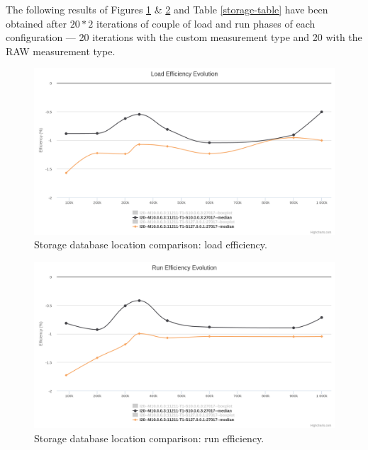 \documentclass[a4paper,11pt]{report}
\begin{document}
The following results of Figures \ref{storage-T1-Mremote-load}  \& \ref{storage-T1-Mremote-run} and Table \ref{storage-table} have been obtained after $20*2$ iterations of couple of load and run phases of each configuration --- 20 iterations with the custom measurement type and 20 with the RAW measurement type.

\begin{figure}[ht]
\begin{center}
\includegraphics[width=1\linewidth]{images/evaluation/storage-T1-Mremote-load.png}
\caption{Storage database location comparison: load efficiency.}
\label{storage-T1-Mremote-load}
\end{center}
\end{figure}

\begin{figure}[ht]
\begin{center}
\includegraphics[width=1\linewidth]{images/evaluation/storage-T1-Mremote-run.png}
\caption{Storage database location comparison: run efficiency.}
\label{storage-T1-Mremote-run}
\end{center}
\end{figure}
\end{document}
